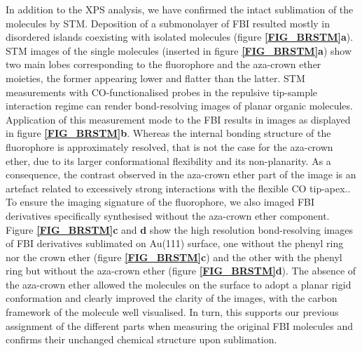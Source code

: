 \documentclass[aps,prl,reprint,longbibliography,superscriptaddress, english]{revtex4-1}
\begin{document}
In addition to the XPS analysis, we have confirmed the intact sublimation of the molecules by STM. Deposition of a submonolayer of FBI resulted mostly in disordered islands coexisting with isolated molecules (figure {\bf \ref{FIG_BRSTM}a}). STM images of the single molecules (inserted in figure  {\bf \ref{FIG_BRSTM}a}) show two main lobes corresponding to the {fluorophore and the aza-crown ether moieties}, the former appearing lower and flatter than the latter. STM measurements with {CO-functionalised} probes in the repulsive tip-sample interaction regime can render bond-resolving images of planar organic molecules.\cite{gross_recent_2011,gross_atomic_2018} Application of this measurement mode to the FBI results in images as displayed in figure {\bf \ref{FIG_BRSTM}b}. Whereas the internal bonding structure of the {fluorophore} is approximately resolved, that is not the case for the {aza-crown ether}, due to its larger {conformational} flexibility and its non-planarity. As a consequence, the contrast {observed} in the {aza-crown ether} part of the image is an artefact related to excessively strong interactions with the flexible CO tip-apex.\cite{moll_mechanisms_2010,hapala_mechanism_2014}. To ensure the imaging signature of the {fluorophore}, we also imaged FBI derivatives specifically synthesised without the {aza-crown ether component}. Figure  {\bf \ref{FIG_BRSTM}c} and {\bf d} show the high resolution bond-resolving images of FBI derivatives sublimated on Au(111) surface, one without the phenyl ring nor the crown ether (figure {\bf \ref{FIG_BRSTM}c})  and the other with {the} phenyl ring but without the {aza-crown ether} (figure {\bf \ref{FIG_BRSTM}d}). The absence of the {aza-crown ether} allowed the molecules on the surface to adopt a planar {rigid conformation} and clearly improved the {clarity of the images}, with the carbon framework of the molecule well visualised. In turn, this supports our previous assignment of the different parts when measuring the original FBI molecules and confirms their unchanged chemical structure upon sublimation.  
\end{document}
